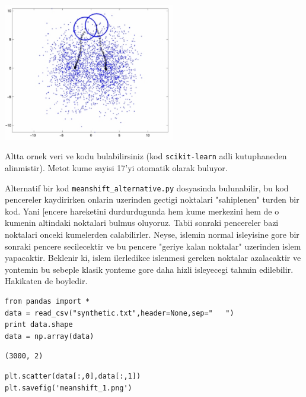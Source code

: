 \documentclass[12pt,fleqn]{article}\usepackage{../common}
\begin{document}
\includegraphics[height=6cm]{start.png}

Altta ornek veri ve kodu bulabilirsiniz (kod \verb!scikit-learn!
adli kutuphaneden alinmistir). Metot kume sayisi 17'yi otomatik olarak
buluyor.

Alternatif bir kod \verb!meanshift_alternative.py! dosyasinda
bulunabilir, bu kod pencereler kaydirirken onlarin uzerinden gectigi
noktalari "sahiplenen" turden bir kod. Yani [encere hareketini
durdurdugunda hem kume merkezini hem de o kumenin altindaki noktalari
bulmus oluyoruz.  Tabii sonraki pencereler bazi noktalari onceki
kumelerden calabilirler. Neyse, islemin normal isleyisine gore bir
sonraki pencere secilecektir ve bu pencere "geriye kalan noktalar"
uzerinden islem yapacaktir.  Beklenir ki, islem ilerledikce islenmesi
gereken noktalar azalacaktir ve yontemin bu sebeple klasik yonteme
gore daha hizli isleyecegi tahmin edilebilir. Hakikaten de boyledir.

\begin{verbatim}
from pandas import *
data = read_csv("synthetic.txt",header=None,sep="   ")
print data.shape
data = np.array(data)
\end{verbatim}

\begin{verbatim}
(3000, 2)
\end{verbatim}

\begin{verbatim}
plt.scatter(data[:,0],data[:,1])
plt.savefig('meanshift_1.png')
\end{verbatim}
\end{document}
